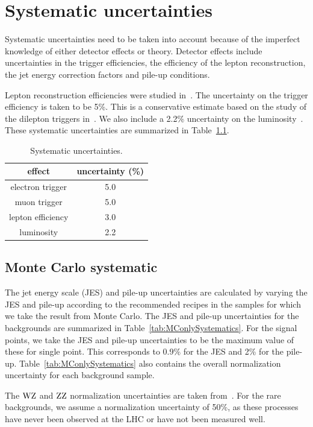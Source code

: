 \chapter{Systematic uncertainties}
Systematic uncertainties need to be taken into account because of the
imperfect knowledge of either detector effects or theory.
Detector effects include uncertainties in the trigger efficiencies, the
efficiency of the lepton reconstruction, the jet energy correction factors
and pile-up conditions.

Lepton reconstruction efficiencies were studied in~\cite{CMS-EXO-12-001}. The uncertainty on the trigger
efficiency is taken to be 5\%. This is a conservative estimate based on the study of the dilepton triggers in~\cite{bprime2011}. We also include a 2.2\% uncertainty 
on the luminosity~\cite{CMS-SMP-12-008}. These systematic uncertainties are summarized in Table~\ref{tab:Systematics}.

\begin{table}
    \centering
\begin{tabular}{*2c}
    \toprule
          effect & uncertainty (\%) \\
          \midrule
  electron trigger          & 5.0 \\
  muon trigger              & 5.0 \\
  lepton efficiency         & 3.0 \\
  luminosity                & 2.2 \\
  \midrule
\end{tabular}
\caption{Systematic uncertainties.}
\label{tab:Systematics}
\end{table}

\section{Monte Carlo systematic}
The jet energy scale (JES) and pile-up uncertainties are calculated by
varying the JES and pile-up according to the recommended recipes in the samples for which 
we take the result from Monte Carlo. The JES and pile-up uncertainties for the backgrounds are 
summarized in Table~\ref{tab:MConlySystematics}. For the signal points, we
take the JES and pile-up uncertainties to be the maximum value of these for single
point. This corresponds to 0.9\% for the JES and 2\% for the pile-up. Table~\ref{tab:MConlySystematics} also
contains the overall normalization uncertainty for each background sample.

The $\mathrm{W}\mathrm{Z}$ and $\mathrm{Z}\mathrm{Z}$ normalization uncertainties are taken from~\cite{CMS-AN-2011-333}. 
For the rare backgrounds, we assume a normalization uncertainty of 50\%, as
these processes have never been observed at the LHC or have not been
measured well.

